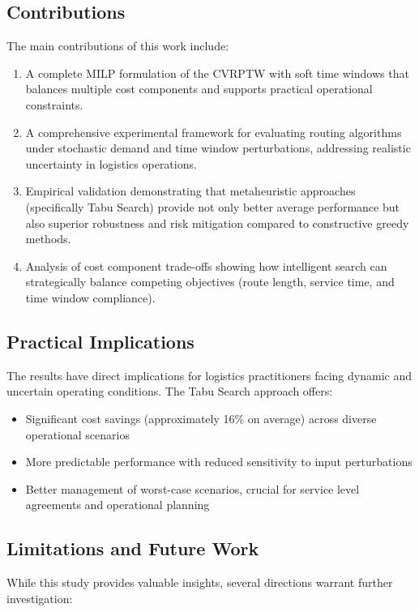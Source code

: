 \subsection{Contributions}

The main contributions of this work include:
\begin{enumerate}
    \item A complete MILP formulation of the CVRPTW with soft time windows that balances multiple cost components and supports practical operational constraints.
    \item A comprehensive experimental framework for evaluating routing algorithms under stochastic demand and time window perturbations, addressing realistic uncertainty in logistics operations.
    \item Empirical validation demonstrating that metaheuristic approaches (specifically Tabu Search) provide not only better average performance but also superior robustness and risk mitigation compared to constructive greedy methods.
    \item Analysis of cost component trade-offs showing how intelligent search can strategically balance competing objectives (route length, service time, and time window compliance).
\end{enumerate}

\subsection{Practical Implications}

The results have direct implications for logistics practitioners facing dynamic and uncertain operating conditions. The Tabu Search approach offers:
\begin{itemize}
    \item Significant cost savings (approximately 16\% on average) across diverse operational scenarios
    \item More predictable performance with reduced sensitivity to input perturbations
    \item Better management of worst-case scenarios, crucial for service level agreements and operational planning
\end{itemize}

\subsection{Limitations and Future Work}

While this study provides valuable insights, several directions warrant further investigation:

